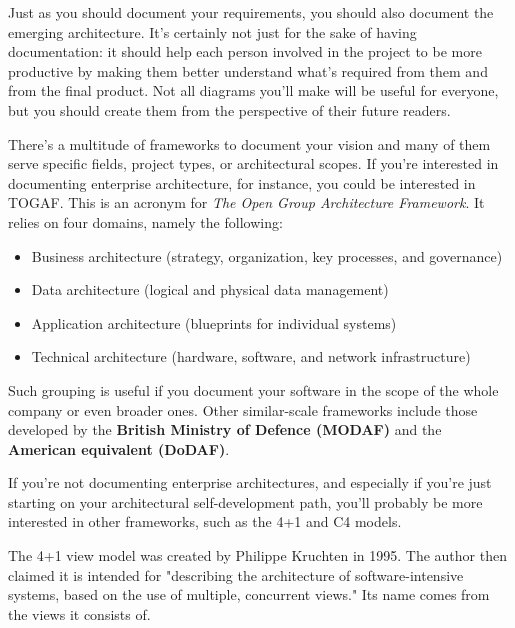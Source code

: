 
Just as you should document your requirements, you should also document the emerging architecture. It's certainly not just for the sake of having documentation: it should help each person involved in the project to be more productive by making them better understand what's required from them and from the final product. Not all diagrams you'll make will be useful for everyone, but you should create them from the perspective of their future readers.

There's a multitude of frameworks to document your vision and many of them serve specific fields, project types, or architectural scopes. If you're interested in documenting enterprise architecture, for instance, you could be interested in TOGAF. This is an acronym for \textit{The Open Group Architecture Framework}. It relies on four domains, namely the following:


\begin{itemize}
\item 
Business architecture (strategy, organization, key processes, and governance)

\item 
Data architecture (logical and physical data management)

\item 
Application architecture (blueprints for individual systems)

\item
Technical architecture (hardware, software, and network infrastructure)
\end{itemize}

Such grouping is useful if you document your software in the scope of the whole company or even broader ones. Other similar-scale frameworks include those developed by the \textbf{British Ministry of Defence (MODAF)} and the \textbf{American equivalent (DoDAF)}.

If you're not documenting enterprise architectures, and especially if you're just starting on your architectural self-development path, you'll probably be more interested in other frameworks, such as the 4+1 and C4 models.


The 4+1 view model was created by Philippe Kruchten in 1995. The author then claimed it is intended for "describing the architecture of software-intensive systems, based on the use of multiple, concurrent views." Its name comes from the views it consists of.

